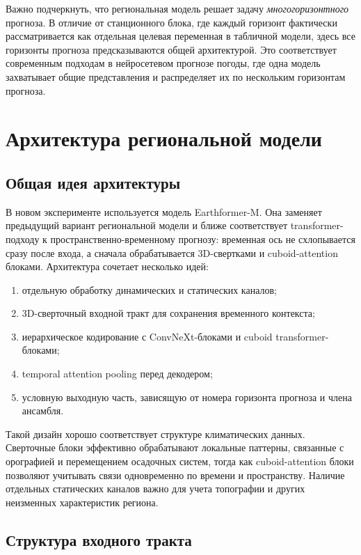 Важно подчеркнуть, что региональная модель решает задачу \textit{многогоризонтного} прогноза. В отличие от станционного блока, где каждый горизонт фактически рассматривается как отдельная целевая переменная в табличной модели, здесь все горизонты прогноза предсказываются общей архитектурой. Это соответствует современным подходам в нейросетевом прогнозе погоды, где одна модель захватывает общие представления и распределяет их по нескольким горизонтам прогноза.

\section{Архитектура региональной модели}

\subsection{Общая идея архитектуры}

В новом эксперименте используется модель Earthformer-M. Она заменяет предыдущий вариант региональной модели и ближе соответствует transformer-подходу к пространственно-временному прогнозу: временная ось не схлопывается сразу после входа, а сначала обрабатывается 3D-свертками и cuboid-attention блоками. Архитектура сочетает несколько идей:
\begin{enumerate}
    \item отдельную обработку динамических и статических каналов;
    \item 3D-сверточный входной тракт для сохранения временного контекста;
    \item иерархическое кодирование с ConvNeXt-блоками и cuboid transformer-блоками;
    \item temporal attention pooling перед декодером;
    \item условную выходную часть, зависящую от номера горизонта прогноза и члена ансамбля.
\end{enumerate}

Такой дизайн хорошо соответствует структуре климатических данных. Сверточные блоки эффективно обрабатывают локальные паттерны, связанные с орографией и перемещением осадочных систем, тогда как cuboid-attention блоки позволяют учитывать связи одновременно по времени и пространству. Наличие отдельных статических каналов важно для учета топографии и других неизменных характеристик региона.

\subsection{Структура входного тракта}

